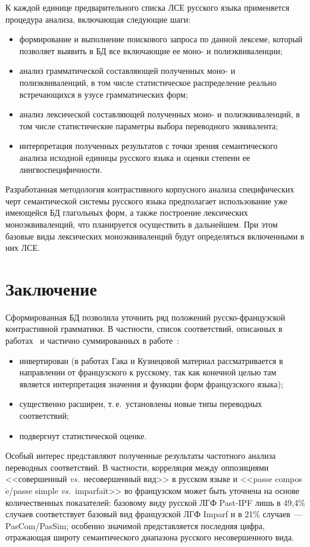 \begin{multicols}{2}
  К каждой единице предварительного списка ЛСЕ
русского языка применяется процедура анализа, включающая следующие шаги:
  \begin{itemize}
  \item формирование и выполнение поискового запроса по данной лексеме,
который позволяет выявить в БД все включающие ее моно- и
полиэквиваленции;
\item анализ грамматической составляющей полученных моно- и
полиэквиваленций, в том числе статистическое распределение реально
встречающихся в узусе грамматических форм;
\item анализ лексической составляющей полученных моно- и
полиэквиваленций, в том числе статистические параметры выбора
переводного эквивалента;
\item интерпретация полученных результатов с точки зрения семантического
анализа исходной единицы русского языка и оценки степени ее
лингвоспецифичности.
  \end{itemize}

  Разработанная методология контрастивного корпусного анализа
специфических черт семантической системы русского языка предполагает
использование уже имеющейся БД глагольных форм, а также построение
лексических моноэквиваленций, что планируется осуществить в дальнейшем.
При этом базовые виды лексических моноэквиваленций будут определяться
включенными в них ЛСЕ.

\section{Заключение} %

  Сформированная БД позволила уточнить ряд положений рус\-ско-фран\-цуз\-ской
  контрастивной грамматики. В частности, список соответствий,
описанных в работах~\cite{zat-11, zat-12} и частично суммированных в
работе~\cite{zat-13}:
  \begin{itemize}
  \item инвертирован (в работах Гака и Кузнецовой материал
рассматривается в направлении от французского к русскому, так как конечной
целью там является интерпретация значения и функции форм французского
языка);
  \item существенно расширен, т.\,е.\ установлены новые типы переводных
соответствий;
  \item подвергнут статистической оценке.
  \end{itemize}

  Особый интерес представляют полученные результаты частотного анализа
переводных соответствий. В частности, корреляция между оппозициями <<совершенный
\textit{vs.}\ несовершенный вид>> в русском языке и <<passe
compos$\acute{\mbox{e}}$/passe simple \textit{vs.}\ imparfait>> во французском
может быть уточнена на основе количественных показателей: базовому виду
русской ЛГФ Past-IPF лишь в 49,4\% случаев соответствует базовый вид
французской ЛГФ Imparf и в 21\% случаев~--- PasCom/PasSim; особенно
значимой представляется последняя цифра, отражающая широту
семантического диапазона русского несовершенного вида.


\end{multicols}
